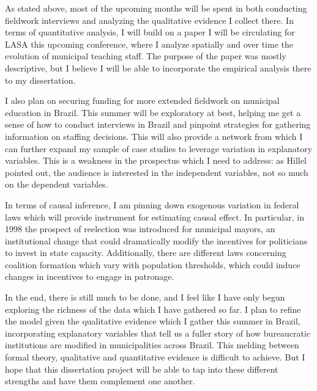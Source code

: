\documentclass[12pt,a4paper]{article}
\begin{document}
As stated above, most of the upcoming months will be spent in both conducting fieldwork interviews and analyzing the qualitative evidence I collect there. In terms of quantitative analysis, I will build on a paper I will be circulating for LASA this upcoming conference, where I analyze spatially and over time the evolution of municipal teaching staff. The purpose of the paper was mostly descriptive, but I believe I will be able to incorporate the empirical analysis there to my dissertation.

I also plan on securing funding for more extended fieldwork on municipal education in Brazil. This summer will be exploratory at best, helping me get a sense of how to conduct interviews in Brazil and pinpoint strategies for gathering information on staffing decisions. This will also provide a network from which I can further expand my sample of case studies to leverage variation in explanatory variables. This is a weakness in the prospectus which I need to address: as Hillel pointed out, the audience is interested in the independent variables, not so much on the dependent variables.

In terms of causal inference, I am pinning down exogenous variation in federal laws which will provide instrument for estimating causal effect. In particular, in 1998 the prospect of reelection was introduced for municipal mayors, an institutional change that could dramatically modify the incentives for politicians to invest in state capacity. Additionally, there are different laws concerning coalition formation which vary with population thresholds, which could induce changes in incentives to engage in patronage.

In the end, there is still much to be done, and I feel like I have only begun exploring the richness of the data which I have gathered so far. I plan to refine the model given the qualitative evidence which I gather this summer in Brazil, incorporating explanatory variables that tell us a fuller story of how bureaucratic institutions are modified in municipalities across Brazil. This melding between formal theory, qualitative and quantitative evidence is difficult to achieve. But I hope that this dissertation project will be able to tap into these different strengths and have them complement one another.
\end{document}
